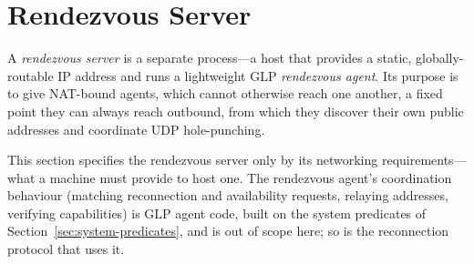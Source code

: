 \section{Rendezvous Server}
\label{sec:rendezvous}
A \emph{rendezvous server} is a separate process---a host that provides a static, globally-routable IP address and runs a lightweight GLP \emph{rendezvous agent}.  Its purpose is to give NAT-bound agents, which cannot otherwise reach one another, a fixed point they can always reach outbound, from which they discover their own public addresses and coordinate UDP hole-punching.

This section specifies the rendezvous server only by its networking requirements---what a machine must provide to host one.  The rendezvous agent's coordination behaviour (matching reconnection and availability requests, relaying addresses, verifying capabilities) is GLP agent code, built on the system predicates of Section~\ref{sec:system-predicates}, and is out of scope here; so is the reconnection protocol that uses it.

